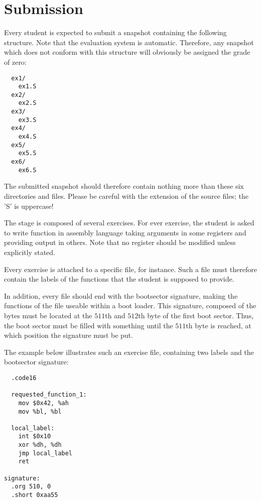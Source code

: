 \newpage

%
%

%
%

\section{Submission}

Every student is expected to submit a snapshot containing the following
structure. Note that the evaluation system is automatic. Therefore, any
snapshot which does not conform with this structure will obviously be assigned
the grade of zero:

\begin{verbatim}
  ex1/
    ex1.S
  ex2/
    ex2.S
  ex3/
    ex3.S
  ex4/
    ex4.S
  ex5/
    ex5.S
  ex6/
    ex6.S
\end{verbatim}

The submitted snapshot should therefore contain nothing more than these
six directories and files. Please be careful with the extension of the source
files; the 'S' is uppercase!

The  stage is composed of several exercises. For ever exercise,
the student is asked to write function in assembly language taking arguments
in some registers and providing output in others. Note that no register should
be modified unless explicitly stated.

Every exercise is attached to a specific file,  for instance.
Such a file must therefore contain the labels of the functions that the student
is supposed to provide.

In addition, every file should end with the bootsector signature, making the
functions of the file useable within a boot loader. This signature, composed
of the bytes  must be located at the $511$th and $512$th byte
of the first boot sector. Thus, the boot sector must be filled with something
until the $511$th byte is reached, at which position the signature must be
put.

The example below illustrates such an exercise file, containing two
labels and the bootsector signature:

\begin{verbatim}
  .code16

  requested_function_1:
    mov $0x42, %ah
    mov %bl, %bl

  local_label:
    int $0x10
    xor %dh, %dh
    jmp local_label
    ret

signature:
  .org 510, 0
  .short 0xaa55
\end{verbatim}

